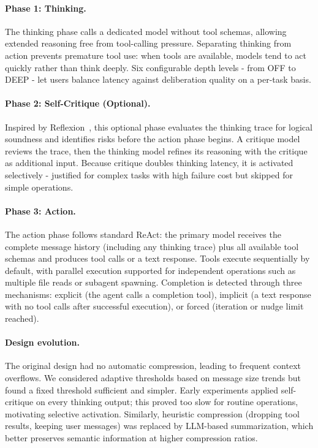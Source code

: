 \paragraph{Phase 1: Thinking.}
The thinking phase calls a dedicated model without tool schemas, allowing extended reasoning free from tool-calling pressure. Separating thinking from action prevents premature tool use: when tools are available, models tend to act quickly rather than think deeply. Six configurable depth levels - from OFF to DEEP - let users balance latency against deliberation quality on a per-task basis.

\paragraph{Phase 2: Self-Critique (Optional).}
Inspired by Reflexion~\cite{shinn2023reflexion}, this optional phase evaluates the thinking trace for logical soundness and identifies risks before the action phase begins. A critique model reviews the trace, then the thinking model refines its reasoning with the critique as additional input. Because critique doubles thinking latency, it is activated selectively - justified for complex tasks with high failure cost but skipped for simple operations.

\paragraph{Phase 3: Action.}
The action phase follows standard ReAct: the primary model receives the complete message history (including any thinking trace) plus all available tool schemas and produces tool calls or a text response. Tools execute sequentially by default, with parallel execution supported for independent operations such as multiple file reads or subagent spawning. Completion is detected through three mechanisms: explicit (the agent calls a completion tool), implicit (a text response with no tool calls after successful execution), or forced (iteration or nudge limit reached).

\paragraph{Design evolution.} The original design had no automatic compression, leading to frequent context overflows. We considered adaptive thresholds based on message size trends but found a fixed threshold sufficient and simpler. Early experiments applied self-critique on every thinking output; this proved too slow for routine operations, motivating selective activation. Similarly, heuristic compression (dropping tool results, keeping user messages) was replaced by LLM-based summarization, which better preserves semantic information at higher compression ratios.

